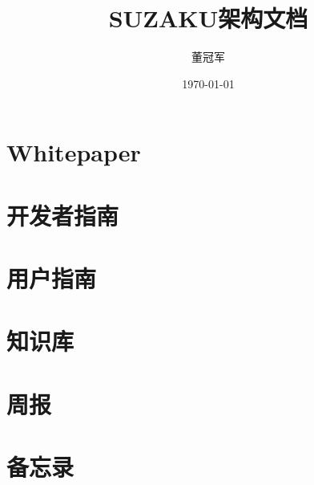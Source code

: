 \documentclass[UTF8,oneside]{ctexbook}
\title{SUZAKU架构文档}
\author{董冠军}
\date{\today}
\begin{document}
\maketitle
\tableofcontents

\listoftodos[Notes]

\part{Whitepaper}





\part{开发者指南}




%
%
%
%



% 
% 




% 
% 

\part{用户指南}







%
%
%
%

\part{知识库}




%
%
%

\part{周报}










\part{备忘录}


% 
% 

\end{document}
